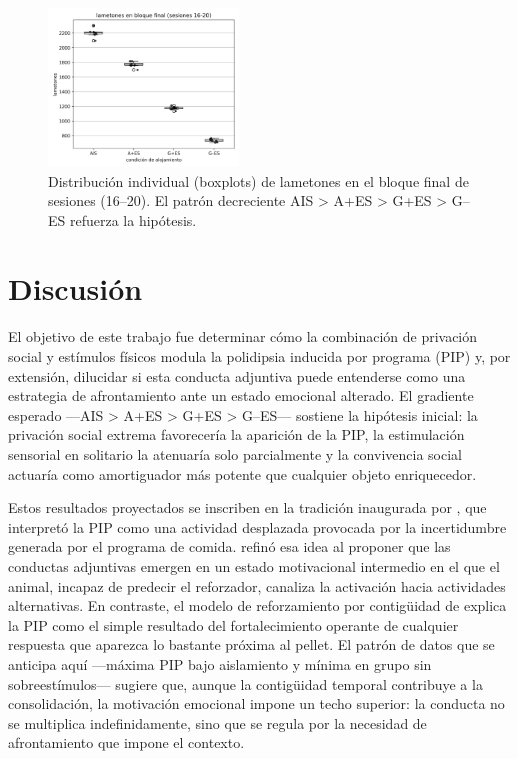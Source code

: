 \documentclass[12pt,a4paper]{article}
\begin{document}
\begin{multicols}{2}
\begin{figure}[H]
\centering
\includegraphics[width=0.45\textwidth]{figura2.png}
\caption{Distribución individual (boxplots) de lametones en el bloque final de sesiones (16–20). El patrón decreciente AIS > A+ES > G+ES > G--ES refuerza la hipótesis.}
\label{fig:figura2}
\end{figure}


\section{Discusión}

El objetivo de este trabajo fue determinar cómo la combinación de privación social y estímulos físicos modula la polidipsia inducida por programa (PIP) y, por extensión, dilucidar si esta conducta adjuntiva puede entenderse como una estrategia de afrontamiento ante un estado emocional alterado. El gradiente esperado —AIS > A+ES > G+ES > G--ES— sostiene la hipótesis inicial: la privación social extrema favorecería la aparición de la PIP, la estimulación sensorial en solitario la atenuaría solo parcialmente y la convivencia social actuaría como amortiguador más potente que cualquier objeto enriquecedor.

Estos resultados proyectados se inscriben en la tradición inaugurada por \citet{Falk1961}, que interpretó la PIP como una actividad desplazada provocada por la incertidumbre generada por el programa de comida. \citet{Staddon1977} refinó esa idea al proponer que las conductas adjuntivas emergen en un estado motivacional intermedio en el que el animal, incapaz de predecir el reforzador, canaliza la activación hacia actividades alternativas. En contraste, el modelo de reforzamiento por contigüidad de \citet{Killeen2013} explica la PIP como el simple resultado del fortalecimiento operante de cualquier respuesta que aparezca lo bastante próxima al pellet. El patrón de datos que se anticipa aquí —máxima PIP bajo aislamiento y mínima en grupo sin sobreestímulos— sugiere que, aunque la contigüidad temporal contribuye a la consolidación, la motivación emocional impone un techo superior: la conducta no se multiplica indefinidamente, sino que se regula por la necesidad de afrontamiento que impone el contexto.


\end{multicols}
\end{document}
